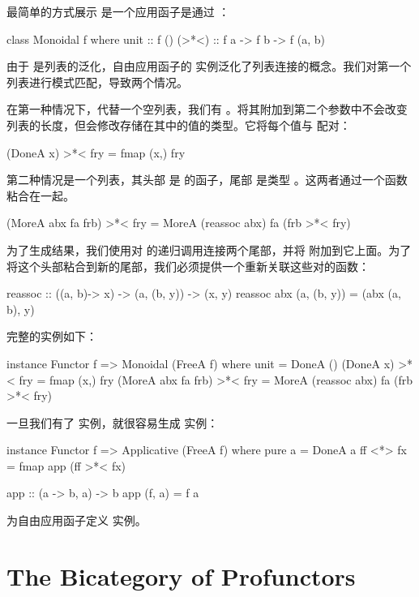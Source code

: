 \documentclass[DaoFP]{subfiles}
\begin{document}
 最简单的方式展示  是一个应用函子是通过 ：
 \begin{haskell}
  class Monoidal f where
  unit  :: f ()
  (>*<) :: f a -> f b -> f (a, b)
 \end{haskell}

 由于  是列表的泛化，自由应用函子的  实例泛化了列表连接的概念。我们对第一个列表进行模式匹配，导致两个情况。

 在第一种情况下，代替一个空列表，我们有 。将其附加到第二个参数中不会改变列表的长度，但会修改存储在其中的值的类型。它将每个值与  配对：
 \begin{haskell}
 (DoneA x) >*< fry = fmap (x,) fry
 \end{haskell}

 第二种情况是一个列表，其头部  是  的函子，尾部  是类型 。这两者通过一个函数  粘合在一起。
 \begin{haskell}
 (MoreA abx fa frb) >*< fry = MoreA (reassoc abx) fa (frb >*< fry)
 \end{haskell}
 为了生成结果，我们使用对 \hask{>*<} 的递归调用连接两个尾部，并将  附加到它上面。为了将这个头部粘合到新的尾部，我们必须提供一个重新关联这些对的函数：
 \begin{haskell}
  reassoc :: ((a, b)-> x) -> (a, (b, y)) -> (x, y)
  reassoc abx (a, (b, y)) = (abx (a, b), y)
 \end{haskell}

 完整的实例如下：
 \begin{haskell}
  instance Functor f => Monoidal (FreeA f) where
  unit = DoneA ()
  (DoneA x) >*< fry = fmap (x,) fry
  (MoreA abx fa frb) >*< fry = MoreA (reassoc abx) fa (frb >*< fry)
 \end{haskell}

 一旦我们有了  实例，就很容易生成  实例：
 \begin{haskell}
  instance Functor f => Applicative (FreeA f) where
  pure a = DoneA a
  ff <*> fx = fmap app (ff >*< fx)

  app :: (a -> b, a) -> b
  app (f, a) = f a
 \end{haskell}

 \begin{exercise}
  为自由应用函子定义  实例。
 \end{exercise}


\section{The Bicategory of Profunctors}
\end{document}
